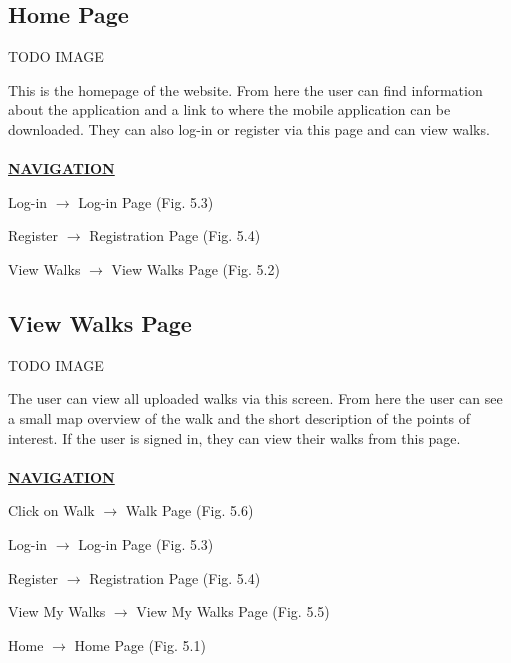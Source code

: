 \documentclass[12pt]{article}
\begin{document}
\subsection{Home Page}
\par{TODO IMAGE}
\par{This is the homepage of the website. From here the user can find information about the application and a link to where the mobile application can be downloaded. They can also log-in or register via this page and can view walks. \\ \\}
\textbf{\uline{NAVIGATION}}
\par{Log-in $\rightarrow$ Log-in Page (Fig. 5.3)}
\par{Register $\rightarrow$ Registration Page (Fig. 5.4)}
\par{View Walks $\rightarrow$ View Walks Page (Fig. 5.2)}
\subsection{View Walks Page}
\par{TODO IMAGE}
\par{The user can view all uploaded walks via this screen. From here the user can see a small map overview of the walk and the short description of the points of interest. If the user is signed in, they can view their walks from this page. \\ \\}
\textbf{\uline{NAVIGATION}}
\par{Click on Walk $\rightarrow$ Walk Page (Fig. 5.6)}
\par{Log-in $\rightarrow$ Log-in Page (Fig. 5.3)}
\par{Register $\rightarrow$ Registration Page (Fig. 5.4)}
\par{View My Walks $\rightarrow$ View My Walks Page (Fig. 5.5)}
\par{Home $\rightarrow$ Home Page (Fig. 5.1)}
\end{document}
